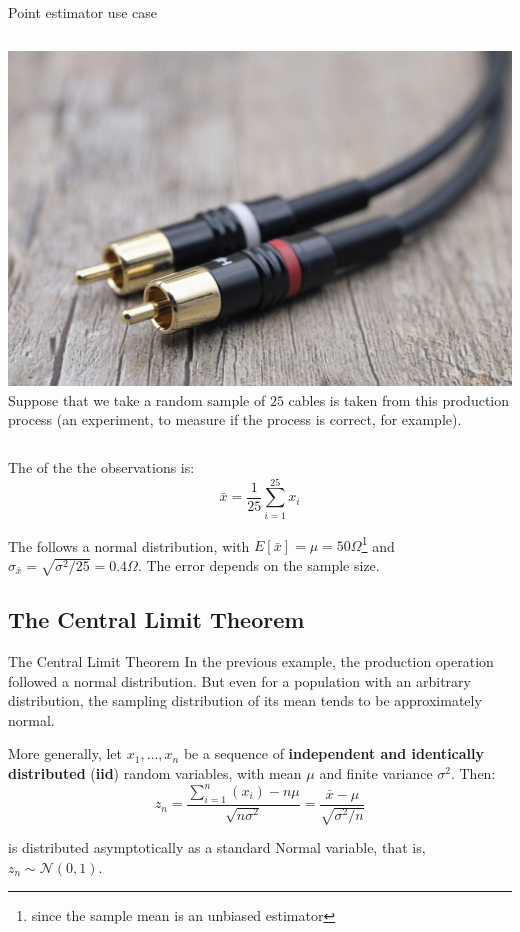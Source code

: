 \begin{frame}{Point estimator use case}
  \begin{columns}
    \includegraphics[width=1\textwidth]{../img/pixabay_cable}
    Suppose that we take a random sample of $25$ cables is taken from
    this production process (an experiment, to measure if the process
    is correct, for example).
  \end{columns}
  \bigskip
The  of the the observations is:
\begin{equation*}
\bar{x} = \frac{1}{25}\sum\limits_{i=1}^{25}{x_i}
\end{equation*}

The  follows a normal distribution, with $E[\bar{x}] = \mu = 50\Omega$\footnote{since the sample mean is an unbiased estimator} and $\sigma_{\bar{x}} = \sqrt{\sigma^2/25} = 0.4\Omega$. The error depends on the sample size.
\end{frame}


\subsection{The Central Limit Theorem}

\begin{frame}{The Central Limit Theorem}
In the previous example, the production operation followed a normal distribution. But even for a population with an arbitrary distribution, the sampling distribution of its mean tends to be approximately normal.
\bigskip

More generally, let $x_1,\ldots,x_n$ be a sequence of \textbf{independent and identically distributed} (\textbf{iid}) random variables, with mean $\mu$ and finite variance $\sigma^2$. Then:
\begin{equation*}
z_n = \frac{\sum\limits_{i=1}^{n}{(x_i)} - n\mu}{\sqrt{n\sigma^2}} = \frac{\bar{x} - \mu}{\sqrt{\sigma^2/n}}
\end{equation*}

is distributed asymptotically as a standard Normal variable, that is, $z_n\sim\mathcal{N}(0,1)$.
\end{frame}

